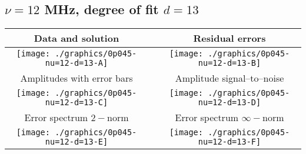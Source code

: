 

% 

\clearpage{}
\break{}

\subsection{$\nu = 12$ MHz, degree of fit $d = 13$}

\begin{table}[h]
    \begin{center}
        \begin{tabular}{ccc}
            Data and solution & \quad & Residual errors \\\hline
            \texttt{[image: ./graphics/0p045-nu=12-d=13-A]} &&
            \texttt{[image: ./graphics/0p045-nu=12-d=13-B]} \\[15pt]
            Amplitudes with error bars && Amplitude signal--to--noise \\\hline
            \texttt{[image: ./graphics/0p045-nu=12-d=13-C]} &&
            \texttt{[image: ./graphics/0p045-nu=12-d=13-D]} \\[15pt]
            Error spectrum $2-$norm && Error spectrum $\infty-$norm \\\hline
            \texttt{[image: ./graphics/0p045-nu=12-d=13-E]} &&
            \texttt{[image: ./graphics/0p045-nu=12-d=13-F]} \\[15pt]
        \end{tabular}
    \end{center}
\label{fig:elev=45, nu=12}
\end{table}



\endinput

